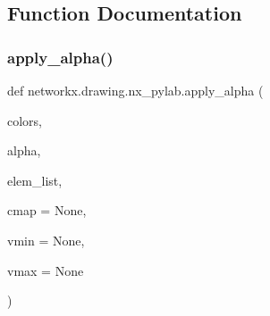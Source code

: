 \subsection{Function Documentation}
\mbox{\label{namespacenetworkx_1_1drawing_1_1nx__pylab_a09fc3bf9141b36d33e22fff1cd99e283}} 
\subsubsection{\texorpdfstring{apply\+\_\+alpha()}{apply\_alpha()}}
{\footnotesize\ttfamily def networkx.\+drawing.\+nx\+\_\+pylab.\+apply\+\_\+alpha (\begin{DoxyParamCaption}\item[{}]{colors,  }\item[{}]{alpha,  }\item[{}]{elem\+\_\+list,  }\item[{}]{cmap = {\ttfamily None},  }\item[{}]{vmin = {\ttfamily None},  }\item[{}]{vmax = {\ttfamily None} }\end{DoxyParamCaption})}

